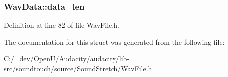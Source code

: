 \subsubsection[{\texorpdfstring{data\+\_\+len}{data_len}}]{ Wav\+Data\+::data\+\_\+len}\hypertarget{struct_wav_data_a3c999a6137f5a93ca2d606c17daeaf84}{}\label{struct_wav_data_a3c999a6137f5a93ca2d606c17daeaf84}


Definition at line 82 of file Wav\+File.\+h.



The documentation for this struct was generated from the following file\+:\begin{DoxyCompactItemize}
\item 
C\+:/\+\_\+dev/\+Open\+U/\+Audacity/audacity/lib-\/src/soundtouch/source/\+Sound\+Stretch/\hyperlink{_wav_file_8h}{Wav\+File.\+h}\end{DoxyCompactItemize}
